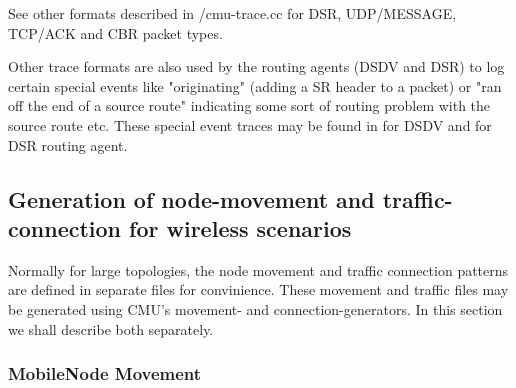 See other formats described in \nsf/cmu-trace.cc for DSR, UDP/MESSAGE, TCP/ACK and CBR packet types.

Other trace formats are also used by the routing agents (DSDV and DSR) to log certain special events like "originating" (adding a SR header to a packet) or  "ran off the end of a source route" indicating some sort of routing problem with the source route etc. These special event traces may be found in  for DSDV and  for DSR routing agent.


\subsection{Generation of node-movement and traffic-connection for wireless scenarios}
\label{sec:mobile-scen-generator}

Normally for large topologies, the node movement and traffic connection patterns are defined in separate files for convinience. These movement and traffic files may be generated using CMU's movement- and connection-generators. In this section we shall describe both separately.


\subsubsection{MobileNode Movement}
\label{sec:mobile-movement-file}

